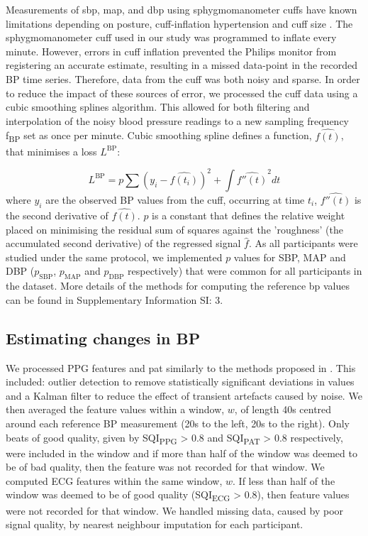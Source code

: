 \documentclass[fleqn,10pt]{wlscirep}
\begin{document}
Measurements of \ac{sbp}, \ac{map}, and \ac{dbp} using sphygmomanometer cuffs have known limitations depending on posture, cuff-inflation hypertension and cuff size \cite{Ogedegbe2010, Lakhal2018}. The sphygmomanometer cuff used in our study was programmed to inflate every minute. However, errors in cuff inflation prevented the Philips monitor from registering an accurate estimate, resulting in a missed data-point in the recorded BP time series. Therefore, data from the cuff was both noisy and sparse. In order to reduce the impact of these sources of error, we processed the cuff data using a cubic smoothing splines \cite{Pollock1993} algorithm. This allowed for both filtering and interpolation of the noisy blood pressure readings to a new sampling frequency f\textsubscript{BP} set as once per minute. Cubic smoothing spline defines a function, $\hat{f(t)}$, that minimises a loss $L^{\text{BP}}$:

\begin{equation}
L^{\text{BP}} = p \sum (y_i - \hat{f(t_i)})^2 + \int \hat{f''(t)}^2 dt
\label{eqn:splines}
\end{equation}
where $y_i$ are the observed BP values from the cuff, occurring at time $t_i$, $\hat{f''(t)}$ is the second derivative of $\hat{f(t)}$. $p$ is a constant that defines the relative weight placed on minimising the residual sum of squares against the 'roughness' (the accumulated second derivative) of the regressed signal $\hat{f}$. As all participants were studied under the same protocol, we implemented $p$ values for SBP, MAP and DBP ($p_{\text{SBP}}$, $p_{\text{MAP}}$ and $p_{\text{DBP}}$ respectively) that were common for all participants in the dataset. More details of the methods for computing the reference \ac{bp} values can be found in Supplementary Information SI: 3.
 
 
\subsection{Estimating changes in BP} 
\label{sec:model}

We processed PPG features and \ac{pat} similarly to the methods proposed in \cite{Finnegan2021}. This included: outlier detection to remove statistically significant deviations in values and a Kalman filter to reduce the effect of transient artefacts caused by noise. We then averaged the feature values within a window, $w$, of length 40s centred around each reference BP measurement (20s to the left, 20s to the right). Only beats of good quality, given by SQI\textsubscript{PPG} > 0.8 and SQI\textsubscript{PAT} > 0.8 respectively, were included in the window and if more than half of the window was deemed to be of bad quality, then the feature was not recorded for that window. We computed ECG features within the same window, $w$. If less than half of the window was deemed to be of good quality (SQI\textsubscript{ECG} > 0.8), then feature values were not recorded for that window. We handled missing data, caused by poor signal quality, by nearest neighbour imputation for each participant.
\end{document}
